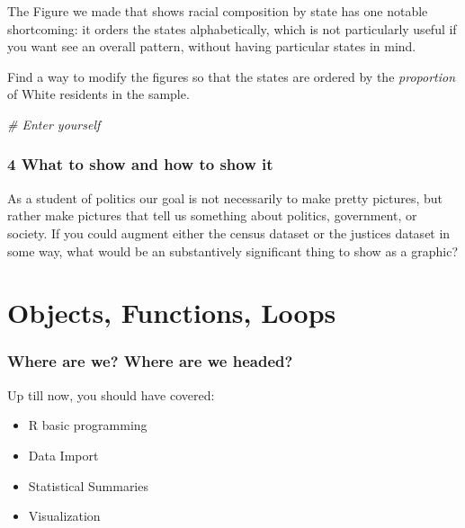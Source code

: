 \documentclass[]{book}
\newenvironment{Shaded}{\begin{snugshade}}{\end{snugshade}}
\newcommand{\CommentTok}[1]{\textcolor[rgb]{0.56,0.35,0.01}{\textit{#1}}}
\providecommand{\tightlist}{%
  \setlength{\itemsep}{0pt}\setlength{\parskip}{0pt}}
\theoremstyle{definition}
\theoremstyle{definition}
\theoremstyle{definition}
\theoremstyle{remark}
\begin{document}
The Figure we made that shows racial composition by state has one notable shortcoming: it orders the states alphabetically, which is not particularly useful if you want see an overall pattern, without having particular states in mind.

Find a way to modify the figures so that the states are ordered by the \emph{proportion} of White residents in the sample.

\begin{Shaded}
\begin{Highlighting}[]
\CommentTok{# Enter yourself}
\end{Highlighting}
\end{Shaded}

\hypertarget{what-to-show-and-how-to-show-it}{%
\subsection*{4 What to show and how to show it}\label{what-to-show-and-how-to-show-it}}

As a student of politics our goal is not necessarily to make pretty pictures, but rather make pictures that tell us something about politics, government, or society. If you could augment either the census dataset or the justices dataset in some way, what would be an substantively significant thing to show as a graphic?

\hypertarget{robjloops}{%
\chapter{Objects, Functions, Loops}\label{robjloops}}

\hypertarget{where-are-we-where-are-we-headed-3}{%
\subsection*{Where are we? Where are we headed?}\label{where-are-we-where-are-we-headed-3}}

Up till now, you should have covered:

\begin{itemize}
\tightlist
\item
  R basic programming
\item
  Data Import
\item
  Statistical Summaries
\item
  Visualization
\end{itemize}
\end{document}
